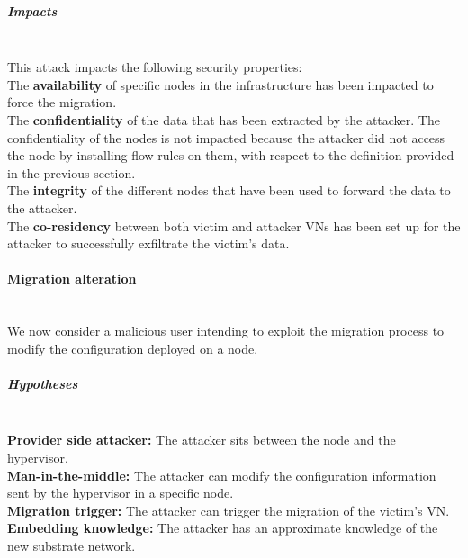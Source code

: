 \subparagraph{Impacts}\textbf{\\}
This attack impacts the following security properties:\\
The \textbf{availability} of specific nodes in the infrastructure has been impacted to force the migration.\\
The \textbf{confidentiality} of the data that has been extracted by the attacker.
The confidentiality of the nodes is not impacted because the attacker did not access the node by installing flow rules on them, with respect to the definition provided in the previous section.\\
The \textbf{integrity} of the different nodes that have been used to forward the data to the attacker.\\
The \textbf{co-residency} between both victim and attacker VNs has been set up for the attacker to successfully exfiltrate the victim's data.

\newpage
\paragraph{Migration alteration}\textbf{\\}
We now consider a malicious user intending to exploit the migration process to modify the configuration deployed on a node.

\subparagraph{Hypotheses}\textbf{\\}
\textbf{Provider side attacker:} The attacker sits between the node and the hypervisor.\\
\textbf{Man-in-the-middle:} The attacker can modify the configuration information sent by the hypervisor in a specific node.\\
\textbf{Migration trigger:} The attacker can trigger the migration of the victim's VN.\\
\textbf{Embedding knowledge:} The attacker has an approximate knowledge of the new substrate network.

